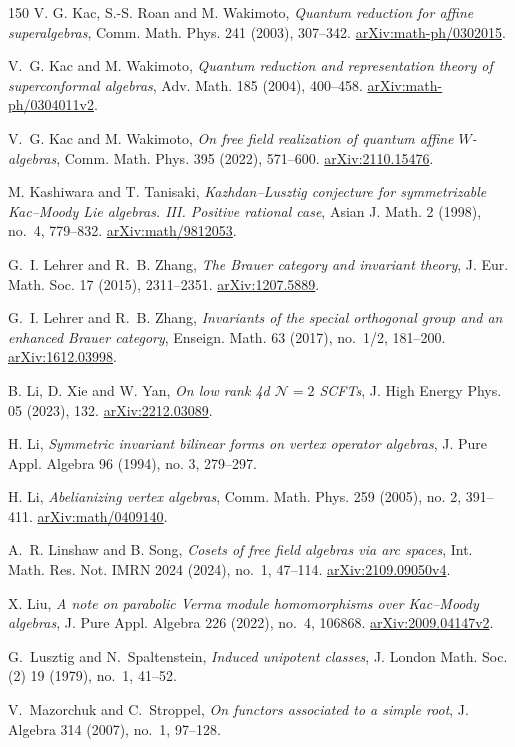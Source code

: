 \documentclass[11pt,a4paper]{amsart}
\numberwithin{equation}{section}
\theoremstyle{definition}
\theoremstyle{remark}
\newcommand{\arxiv}[1]{\href{https://arxiv.org/abs/#1}{arXiv:#1}}
\begin{document}
\begin{thebibliography}{150}
 V. G. Kac, S.-S. Roan and M. Wakimoto,
\emph{Quantum reduction for affine superalgebras},
Comm. Math. Phys. 241 (2003), 307--342. \arxiv{math-ph/0302015}.

 V.~G. Kac and M. Wakimoto,
\emph{Quantum reduction and representation theory of superconformal algebras},
Adv. Math. 185 (2004), 400--458. \arxiv{math-ph/0304011v2}.

 V.~G. Kac and M. Wakimoto,
\emph{On free field realization of quantum affine $W$-algebras},
Comm. Math. Phys. 395 (2022), 571--600. \arxiv{2110.15476}.

 M. Kashiwara and T. Tanisaki,
\emph{Kazhdan--Lusztig conjecture for symmetrizable Kac--Moody Lie algebras.
III. Positive rational case},
Asian J. Math. 2 (1998), no.~4, 779--832. \arxiv{math/9812053}.

 G.~I. Lehrer and R.~B. Zhang,
\emph{The Brauer category and invariant theory},
J. Eur. Math. Soc. 17 (2015), 2311--2351. \arxiv{1207.5889}.

 G.~I. Lehrer and R.~B. Zhang,
\emph{Invariants of the special orthogonal group and an enhanced Brauer category},
Enseign. Math. 63 (2017), no.~1/2, 181--200. \arxiv{1612.03998}.

 B. Li, D. Xie and W. Yan,
\emph{On low rank 4d $\mathcal N=2$ SCFTs},
J. High Energy Phys. 05 (2023), 132. \arxiv{2212.03089}.

 H. Li,
\emph{Symmetric invariant bilinear forms on vertex operator algebras},
J. Pure Appl. Algebra 96 (1994), no. 3, 279--297.

 H. Li,
\emph{Abelianizing vertex algebras},
Comm. Math. Phys. 259 (2005), no. 2, 391--411. \arxiv{math/0409140}.

 A.~R. Linshaw and B. Song,
\emph{Cosets of free field algebras via arc spaces},
Int. Math. Res. Not. IMRN 2024 (2024), no.~1, 47--114. \arxiv{2109.09050v4}.

 X. Liu,
\emph{A note on parabolic Verma module homomorphisms over Kac--Moody algebras},
J. Pure Appl. Algebra 226 (2022), no.~4, 106868. \arxiv{2009.04147v2}.

 G.~Lusztig and N.~Spaltenstein,
\emph{Induced unipotent classes},
J. London Math. Soc. (2) 19 (1979), no.~1, 41--52.

 V.~Mazorchuk and C.~Stroppel,
\emph{On functors associated to a simple root},
J. Algebra 314 (2007), no.~1, 97--128.



\end{thebibliography}
\end{document}
